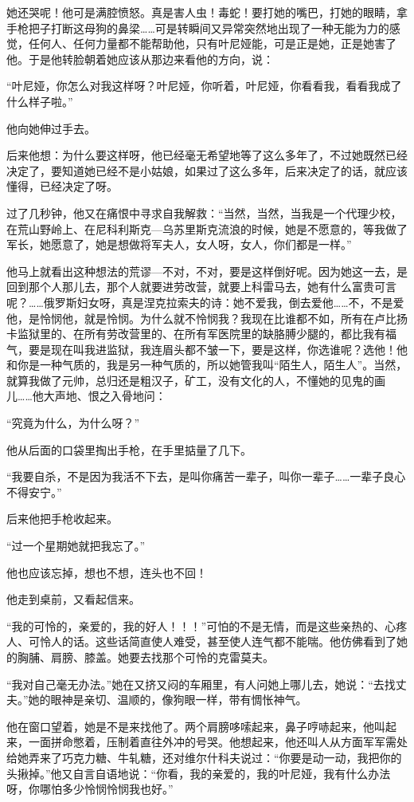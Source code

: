 她还哭呢！他可是满腔愤怒。真是害人虫！毒蛇！要打她的嘴巴，打她的眼睛，拿手枪把子打断这母狗的鼻梁……可是转瞬间又异常突然地出现了一种无能为力的感觉，任何人、任何力量都不能帮助他，只有叶尼娅能，可是正是她，正是她害了他。于是他转脸朝着她应该从那边来看他的方向，说：

“叶尼娅，你怎么对我这样呀？叶尼娅，你听着，叶尼娅，你看看我，看看我成了什么样子啦。”

他向她伸过手去。

后来他想：为什么要这样呀，他已经毫无希望地等了这么多年了，不过她既然已经决定了，要知道她已经不是小姑娘，如果过了这么多年，后来决定了的话，就应该懂得，已经决定了呀。

过了几秒钟，他又在痛恨中寻求自我解救：“当然，当然，当我是一个代理少校，在荒山野岭上、在尼科利斯克—乌苏里斯克流浪的时候，她是不愿意的，等我做了军长，她愿意了，她是想做将军夫人，女人呀，女人，你们都是一样。”

他马上就看出这种想法的荒谬—不对，不对，要是这样倒好呢。因为她这一去，是回到那个人那儿去，那个人就要进劳改营，就要上科雷马去，她有什么富贵可言呢？……俄罗斯妇女呀，真是涅克拉索夫的诗：她不爱我，倒去爱他……不，不是爱他，是怜悯他，就是怜悯。为什么就不怜悯我？我现在比谁都不如，所有在卢比扬卡监狱里的、在所有劳改营里的、在所有军医院里的缺胳膊少腿的，都比我有福气，要是现在叫我进监狱，我连眉头都不皱一下，要是这样，你选谁呢？选他！他和你是一种气质的，我是另一种气质的，所以她管我叫“陌生人，陌生人”。当然，就算我做了元帅，总归还是粗汉子，矿工，没有文化的人，不懂她的见鬼的画儿……他大声地、恨之入骨地问：

“究竟为什么，为什么呀？”

他从后面的口袋里掏出手枪，在手里掂量了几下。

“我要自杀，不是因为我活不下去，是叫你痛苦一辈子，叫你一辈子……一辈子良心不得安宁。”

后来他把手枪收起来。

“过一个星期她就把我忘了。”

他也应该忘掉，想也不想，连头也不回！

他走到桌前，又看起信来。

“我的可怜的，亲爱的，我的好人！！！”可怕的不是无情，而是这些亲热的、心疼人、可怜人的话。这些话简直使人难受，甚至使人连气都不能喘。他仿佛看到了她的胸脯、肩膀、膝盖。她要去找那个可怜的克雷莫夫。

“我对自己毫无办法。”她在又挤又闷的车厢里，有人问她上哪儿去，她说：“去找丈夫。”她的眼神是亲切、温顺的，像狗眼一样，带有惆怅神气。

他在窗口望着，她是不是来找他了。两个肩膀哆嗦起来，鼻子哼哧起来，他叫起来，一面拼命憋着，压制着直往外冲的号哭。他想起来，他还叫人从方面军军需处给她弄来了巧克力糖、牛轧糖，还对维尔什科夫说过：“你要是动一动，我把你的头揪掉。”他又自言自语地说：“你看，我的亲爱的，我的叶尼娅，我有什么办法呀，你哪怕多少怜悯怜悯我也好。”

